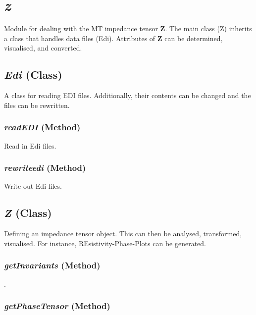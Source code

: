 \section{\textit{z} }
\label{sec:core.z}

Module for dealing with the MT impedance tensor $\mathbf{Z}$. The main class (Z) inherits a class that handles data files (Edi). Attributes of $\mathbf{Z}$ can be determined, visualised, and converted. 

\subsection{\textit{Edi} (Class)}
\label{ssec:core.z.Edi}

A class for reading EDI files. Additionally, their contents can be changed and the files can be rewritten. 

\subsubsection{\textit{readEDI} (Method)}
\label{sssec:core.z.Edi.readEDI}

Read in Edi files.

\subsubsection{\textit{rewriteedi} (Method)}
\label{sssec:core.z.Edi.rewriteedi}

Write out Edi files.

\subsection{\textit{Z} (Class)}
\label{ssec:core.z.Z}

Defining an impedance tensor object. This can then be analysed, transformed, visualised. For instance, REsistivity-Phase-Plots can be generated. 

\subsubsection{\textit{getInvariants} (Method)}
\label{sssec:core.z.Z.getInvariants}

.

\subsubsection{\textit{getPhaseTensor} (Method)}
\label{sssec:core.z.Z.getPhaseTensor}

